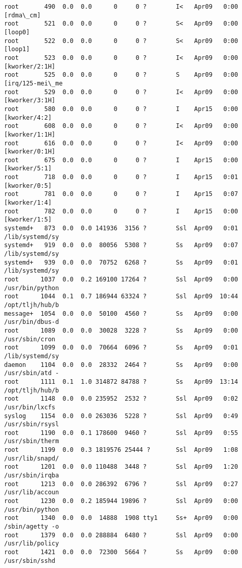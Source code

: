 \documentclass[11pt]{article}
\begin{document}
\begin{Verbatim}[commandchars=\\\{\}]
root       490  0.0  0.0      0     0 ?        I<   Apr09   0:00 [rdma\_cm]
root       521  0.0  0.0      0     0 ?        S<   Apr09   0:00 [loop0]
root       522  0.0  0.0      0     0 ?        S<   Apr09   0:00 [loop1]
root       523  0.0  0.0      0     0 ?        I<   Apr09   0:00 [kworker/2:1H]
root       525  0.0  0.0      0     0 ?        S    Apr09   0:00 [irq/125-mei\_me
root       529  0.0  0.0      0     0 ?        I<   Apr09   0:00 [kworker/3:1H]
root       580  0.0  0.0      0     0 ?        I    Apr15   0:00 [kworker/4:2]
root       608  0.0  0.0      0     0 ?        I<   Apr09   0:00 [kworker/1:1H]
root       616  0.0  0.0      0     0 ?        I<   Apr09   0:00 [kworker/0:1H]
root       675  0.0  0.0      0     0 ?        I    Apr15   0:00 [kworker/5:1]
root       718  0.0  0.0      0     0 ?        I    Apr15   0:01 [kworker/0:5]
root       781  0.0  0.0      0     0 ?        I    Apr15   0:07 [kworker/1:4]
root       782  0.0  0.0      0     0 ?        I    Apr15   0:00 [kworker/1:5]
systemd+   873  0.0  0.0 141936  3156 ?        Ssl  Apr09   0:01 /lib/systemd/sy
systemd+   919  0.0  0.0  80056  5308 ?        Ss   Apr09   0:07 /lib/systemd/sy
systemd+   939  0.0  0.0  70752  6268 ?        Ss   Apr09   0:01 /lib/systemd/sy
root      1037  0.0  0.2 169100 17264 ?        Ssl  Apr09   0:00 /usr/bin/python
root      1044  0.1  0.7 186944 63324 ?        Ssl  Apr09  10:44 /opt/tljh/hub/b
message+  1054  0.0  0.0  50100  4560 ?        Ss   Apr09   0:00 /usr/bin/dbus-d
root      1089  0.0  0.0  30028  3228 ?        Ss   Apr09   0:00 /usr/sbin/cron
root      1099  0.0  0.0  70664  6096 ?        Ss   Apr09   0:01 /lib/systemd/sy
daemon    1104  0.0  0.0  28332  2464 ?        Ss   Apr09   0:00 /usr/sbin/atd -
root      1111  0.1  1.0 314872 84788 ?        Ss   Apr09  13:14 /opt/tljh/hub/b
root      1148  0.0  0.0 235952  2532 ?        Ssl  Apr09   0:02 /usr/bin/lxcfs
syslog    1154  0.0  0.0 263036  5228 ?        Ssl  Apr09   0:49 /usr/sbin/rsysl
root      1190  0.0  0.1 178600  9460 ?        Ssl  Apr09   0:55 /usr/sbin/therm
root      1199  0.0  0.3 1819576 25444 ?       Ssl  Apr09   1:08 /usr/lib/snapd/
root      1201  0.0  0.0 110488  3448 ?        Ssl  Apr09   1:20 /usr/sbin/irqba
root      1213  0.0  0.0 286392  6796 ?        Ssl  Apr09   0:27 /usr/lib/accoun
root      1230  0.0  0.2 185944 19896 ?        Ssl  Apr09   0:00 /usr/bin/python
root      1340  0.0  0.0  14888  1908 tty1     Ss+  Apr09   0:00 /sbin/agetty -o
root      1379  0.0  0.0 288884  6480 ?        Ssl  Apr09   0:00 /usr/lib/policy
root      1421  0.0  0.0  72300  5664 ?        Ss   Apr09   0:00 /usr/sbin/sshd

\end{Verbatim}
\end{document}
